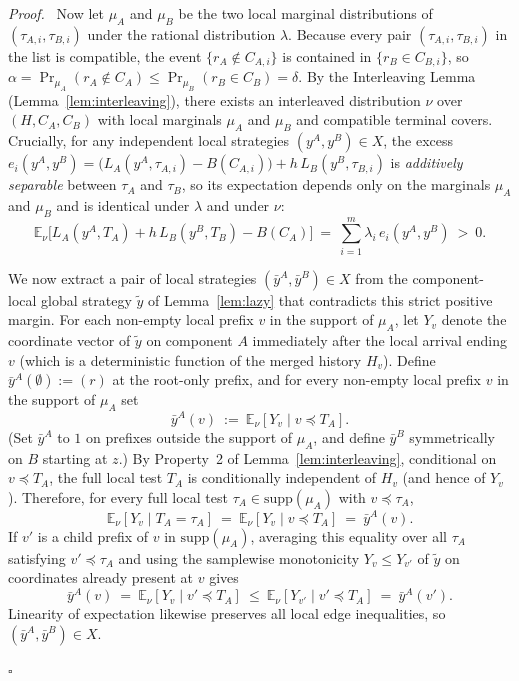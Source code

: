 \documentclass[11pt,letterpaper]{article}
\newenvironment{proof}[1][Proof]{\par\smallskip\noindent\textit{#1.}\ \ignorespaces}{\hfill$\square$\par\medskip}
\begin{document}
\begin{proof}
Now let $\mu_A$ and $\mu_B$ be the two local marginal distributions of $(\tau_{A,i},\tau_{B,i})$ under the rational distribution $\lambda$. Because every pair $(\tau_{A,i},\tau_{B,i})$ in the list is compatible, the event $\{r_A\notin C_{A,i}\}$ is contained in $\{r_B\in C_{B,i}\}$, so $\alpha = \Pr_{\mu_A}(r_A\notin C_A) \le \Pr_{\mu_B}(r_B\in C_B) = \delta$. By the Interleaving Lemma (Lemma~\ref{lem:interleaving}), there exists an interleaved distribution $\nu$ over $(H,C_A,C_B)$ with local marginals $\mu_A$ and $\mu_B$ and compatible terminal covers. Crucially, for any independent local strategies $(y^A,y^B)\in X$, the excess $e_i(y^A,y^B) = \bigl(L_A(y^A,\tau_{A,i})-B(C_{A,i})\bigr) + h\,L_B(y^B,\tau_{B,i})$ is \emph{additively separable} between $\tau_A$ and $\tau_B$, so its expectation depends only on the marginals $\mu_A$ and $\mu_B$ and is identical under $\lambda$ and under $\nu$:
\[
  \mathbb E_\nu\bigl[L_A(y^A,T_A) + h\,L_B(y^B,T_B) - B(C_A)\bigr]\ =\ \sum_{i=1}^m \lambda_i\,e_i(y^A,y^B)\ >\ 0.
\]

We now extract a pair of local strategies $(\bar y^A,\bar y^B)\in X$ from the component-local global strategy $\tilde y$ of Lemma~\ref{lem:lazy} that contradicts this strict positive margin. For each non-empty local prefix $v$ in the support of $\mu_A$, let $Y_v$ denote the coordinate vector of $\tilde y$ on component $A$ immediately after the local arrival ending $v$ (which is a deterministic function of the merged history $H_v$). Define $\bar y^A(\emptyset):=(r)$ at the root-only prefix, and for every non-empty local prefix $v$ in the support of $\mu_A$ set
\[
  \bar y^A(v)\ :=\ \mathbb E_\nu[Y_v\mid v\preceq T_A].
\]
(Set $\bar y^A$ to $1$ on prefixes outside the support of $\mu_A$, and define $\bar y^B$ symmetrically on $B$ starting at $z$.) By Property~2 of Lemma~\ref{lem:interleaving}, conditional on $v\preceq T_A$, the full local test $T_A$ is conditionally independent of $H_v$ (and hence of $Y_v$). Therefore, for every full local test $\tau_A\in\mathrm{supp}(\mu_A)$ with $v\preceq\tau_A$,
\[
  \mathbb E_\nu[Y_v\mid T_A=\tau_A]\ =\ \mathbb E_\nu[Y_v\mid v\preceq T_A]\ =\ \bar y^A(v).
\]
If $v'$ is a child prefix of $v$ in $\mathrm{supp}(\mu_A)$, averaging this equality over all $\tau_A$ satisfying $v'\preceq\tau_A$ and using the samplewise monotonicity $Y_v\le Y_{v'}$ of $\tilde y$ on coordinates already present at $v$ gives
\[
  \bar y^A(v)\ =\ \mathbb E_\nu[Y_v\mid v'\preceq T_A]\ \le\ \mathbb E_\nu[Y_{v'}\mid v'\preceq T_A]\ =\ \bar y^A(v').
\]
Linearity of expectation likewise preserves all local edge inequalities, so $(\bar y^A,\bar y^B)\in X$.


\end{proof}
\end{document}
